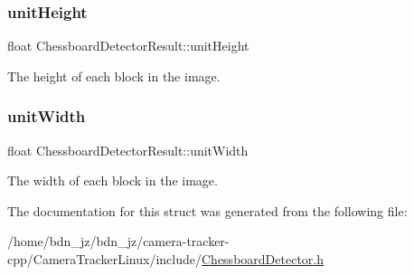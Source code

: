 \subsubsection{\texorpdfstring{unit\+Height}{unitHeight}}
{\footnotesize\ttfamily float Chessboard\+Detector\+Result\+::unit\+Height}

The height of each block in the image. \mbox{\label{struct_chessboard_detector_result_a967889233f9ea3e34e7b215041105801}} 
\subsubsection{\texorpdfstring{unit\+Width}{unitWidth}}
{\footnotesize\ttfamily float Chessboard\+Detector\+Result\+::unit\+Width}

The width of each block in the image. 

The documentation for this struct was generated from the following file\+:\begin{DoxyCompactItemize}
\item 
/home/bdn\+\_\+jz/bdn\+\_\+jz/camera-\/tracker-\/cpp/\+Camera\+Tracker\+Linux/include/\hyperlink{_chessboard_detector_8h}{Chessboard\+Detector.\+h}\end{DoxyCompactItemize}
